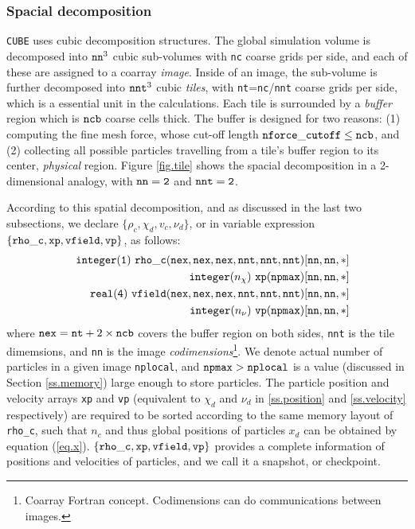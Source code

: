 \documentclass[10pt,twocolumn,preprint]{emulateapj}
\begin{document}
\subsubsection{Spacial decomposition}\label{sss.spatial_decomposition}
{\tt CUBE} uses cubic decomposition structures. The global simulation volume is decomposed into ${\tt nn}^3$ cubic sub-volumes with {\tt nc} coarse grids per side, and each of these are assigned to a coarray {\it image}. Inside of an image, the sub-volume is further decomposed into ${\tt nnt}^3$ cubic {\it tiles}, with {\tt nt}={\tt nc}/{\tt nnt} coarse grids per side, which is a essential unit in the calculations. Each tile is surrounded by a {\it buffer} region which is ${\tt ncb}$ coarse cells thick. The buffer is designed for two reasons: (1) computing the fine mesh force, whose cut-off length ${\tt nforce\_cutoff}\leq{\tt ncb}$, and (2) collecting all possible particles travelling from a tile's buffer region to its center, {\it physical} region. Figure \ref{fig.tile} shows the spacial decomposition in a 2-dimensional analogy, with ${\tt nn=2}$ and ${\tt nnt=2}$.

According to this spatial decomposition, and as discussed in the last two subsections, we declare $\{\rho_c,\chi_d,v_c,\nu_d\}$, or in variable expression $\{{\tt rho\_c},{\tt xp},{\tt vfield},{\tt vp}\}$, as follows:
\begin{eqnarray*}
	&&{\tt integer(1)\ rho\_c(nex,nex,nex,nnt,nnt,nnt)[nn,nn,*]}\\
	&&{\tt integer(}n_\chi{\tt )\ xp(npmax)[nn,nn,*]}\\
	&&{\tt real(4)\ vfield(nex,nex,nex,nnt,nnt,nnt)[nn,nn,*]}\\
	&&{\tt integer(}n_\nu{\tt )\ vp(npmax)[nn,nn,*]}
\end{eqnarray*}
where ${\tt nex}={\tt nt}+2\times{\tt ncb}$ covers the buffer region on both sides, {\tt nnt} is the tile dimemsions, and {\tt nn} is the image {\it codimensions}\footnote{Coarray Fortran concept. Codimensions can do communications between images.}. We denote actual number of particles in a given image {\tt nplocal}, and ${\tt npmax}>{\tt nplocal}$ is a value (discussed in Section \ref{ss.memory}) large enough to store particles. The particle position and velocity arrays {\tt xp} and {\tt vp} (equivalent to $\chi_d$ and $\nu_d$ in \ref{ss.position} and \ref{ss.velocity} respectively) are required to be sorted according to the same memory layout of {\tt rho\_c}, such that $n_c$ and thus global positions of particles $x_d$ can be obtained by equation (\ref{eq.x}). $\{{\tt rho\_c},{\tt xp},{\tt vfield},{\tt vp}\}$ provides a complete information of positions and velocities of particles, and we call it a snapshot, or checkpoint.
\end{document}
